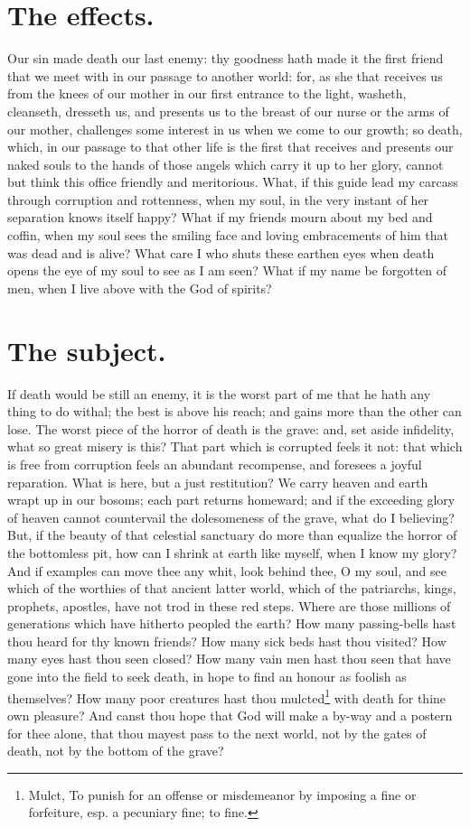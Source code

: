 \section{The effects.}
Our sin made death our last enemy: thy goodness hath made it the first friend that we meet with in our passage to another world: for, as she that receives us from the knees of our mother in our first entrance to the light, washeth, cleanseth, dresseth us, and presents us to the breast of our nurse or the arms of our mother, challenges some interest in us when we come to our growth; so death, which, in our passage to that other life is the first that receives and presents our naked souls to the hands of those angels which carry it up to her glory, cannot but think this office friendly and meritorious. What, if this guide lead my carcass through corruption and rottenness, when my soul, in the very instant of her separation knows itself happy? What if my friends mourn about my bed and coffin, when my soul sees the smiling face and loving embracements of him that was dead and is alive? What care I who shuts these earthen eyes when death opens the eye of my soul to see as I am seen? What if my name be forgotten of men, when I live above with the God of spirits? 

\section{The subject.}
If death would be still an enemy, it is the worst part of me that he hath any thing to do withal; the best is above his reach; and gains more than the other can lose. The worst piece of the horror of death is the grave: and, set aside infidelity, what so great misery is this? That part which is corrupted feels it not: that which is free from corruption feels an abundant recompense, and foresees a joyful reparation. What is here, but a just restitution? We carry heaven and earth wrapt up in our bosoms; each part returns homeward; and if the exceeding glory of heaven cannot countervail the dolesomeness of the grave, what do I believing? But, if the beauty of that celestial sanctuary do more than equalize the horror of the bottomless pit, how can I shrink at earth like myself, when I know my glory? And if examples can move thee any whit, look behind thee, O my soul, and see which of the worthies of that ancient latter world, which of the patriarchs, kings, prophets, apostles, have not trod in these red steps. Where are those millions of generations which have hitherto peopled the earth? How many passing-bells hast thou heard for thy known friends? How many sick beds hast thou visited? How many eyes hast thou seen closed? How many vain men hast thou seen that have gone into the field to seek death, in hope to find an honour as foolish as themselves? How many poor creatures hast thou mulcted\footnote{Mulct, To punish for an offense or misdemeanor by imposing a fine or forfeiture, esp. a pecuniary fine; to fine.\cite{webs1913}} with death for thine own pleasure? And canst thou hope that God will make a by-way and a postern for thee alone, that thou mayest pass to the next world, not by the gates of death, not by the bottom of the grave? 
 
